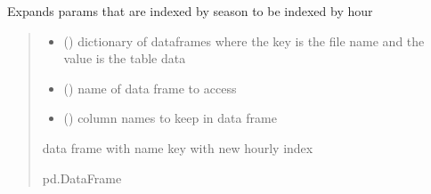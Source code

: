 \documentclass[letterpaper,10pt,english]{sphinxmanual}
\begin{document}
\begin{fulllineitems}
\label{\detokenize{src.models.electricity.scripts.preprocessor:src.models.electricity.scripts.preprocessor.create_hourly_params}}
\pysigstartsignatures
\pysiglinewithargsret
{}
{\sphinxparamcomma {}\sphinxparamcomma {}}
{}
\pysigstopsignatures
\sphinxAtStartPar
Expands params that are indexed by season to be indexed by hour
\begin{quote}\begin{description}
\begin{itemize}
\item {} 
\sphinxAtStartPar
{} () \textendash{} dictionary of dataframes where the key is the file name and the value is the table data

\item {} 
\sphinxAtStartPar
{} () \textendash{} name of data frame to access

\item {} 
\sphinxAtStartPar
{} (\sphinxstyleliteralemphasis{\sphinxupquote{{[}}}\sphinxstyleliteralemphasis{\sphinxupquote{{]}}}) \textendash{} column names to keep in data frame

\end{itemize}

\sphinxAtStartPar
data frame with name key with new hourly index

\sphinxAtStartPar
pd.DataFrame

\end{description}\end{quote}

\end{fulllineitems}

\end{document}
